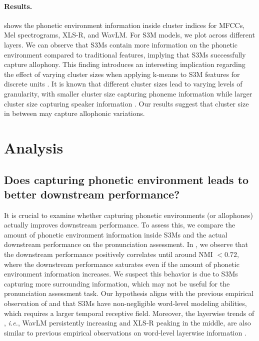 \paragraph{Results.} 
 shows the phonetic environment information inside cluster indices for MFCCs, Mel spectrograms, XLS-R, and WavLM.
For S3M models, we plot across different layers.
We can observe that S3Ms contain more information on the phonetic environment compared to traditional features, implying that S3Ms successfully capture allophony.
This finding introduces an interesting implication regarding the effect of varying cluster sizes when applying k-means to S3M features for discrete units \citep{chang2024exploring}. 
It is known that different cluster sizes lead to varying levels of granularity, with smaller cluster size capturing phoneme information while larger cluster size capturing speaker information \citep{sicherman2023analysing}.
Our results suggest that cluster size in between may capture allophonic variations.



\section{Analysis}\label{sec:discuss}
\subsection{Does capturing phonetic environment leads to better downstream performance?} \label{subsec:pnmi_vs_task}

It is crucial to examine whether capturing phonetic environments (or allophones) actually improves downstream performance. 
To assess this, we compare the amount of phonetic environment information inside S3Ms and the actual downstream performance on the pronunciation assessment.
In , we observe that the downstream performance positively correlates until around NMI $< 0.72$, where the downstream performance saturates even if the amount of phonetic environment information increases.
We suspect this behavior is due to S3Ms capturing more surrounding information, which may not be useful for the pronunciation assessment task.
Our hypothesis aligns with the previous empirical observation of \citet{pasad2023comparative} and \citet{choi2024self} that S3Ms have non-negligible word-level modeling abilities, which requires a larger temporal receptive field.
Moreover, the layerwise trends of , \textit{i.e.}, WavLM persistently increasing and XLS-R peaking in the middle, are also similar to previous empirical observations on word-level layerwise information \citep{pasad2023comparative}.


